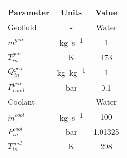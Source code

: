 \begin{tabular}{|p{2.5cm} c c|}
    \hline
    \rowcolor{bluepoli!40} %
    \textbf{Parameter} & \textbf{Units} & \textbf{Value}  \T\B \\
    \hline \hline
    Geofluid & - & Water \T\B\\
    \(\Dot{m}^{geo}\)  & \unit{\kg\per\s} & \num{1} \T\B\\
    \(T_{in}^{geo}\) & \unit{\K} & \num{473} \T\B\\
    \(Q_{in}^{geo}\) & \unit{\kg\per\kg} & \num{1} \T\B\\
    \(P_{cond}^{geo}\) & \unit{\bar} & \num{0.1} \T\B\\
    \hline
    Coolant & - & Water \T\B\\
    \(\Dot{m}^{cool}\)  & \unit{\kg\per\s} & \num{100} \T\B\\
    \(P_{in}^{cool}\) & \unit{\bar} & \num{1.01325} \T\B\\
    \(T_{in}^{cool}\) & \unit{\K} & \num{298} \T\B\\
    \hline
\end{tabular}